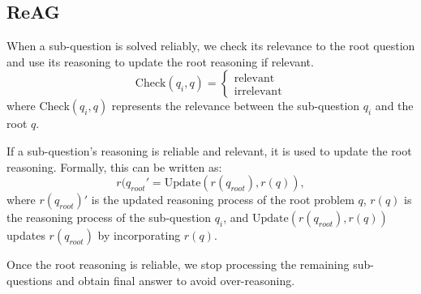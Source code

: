 \documentclass[11pt]{article}
\begin{document}
\subsection{ReAG}
\label{sec:reag}
When a sub-question is solved reliably, we check its relevance to the root question and use its reasoning to update the root reasoning if relevant.
\begin{equation}
\text{Check}(q_i, q) = 
    \begin{cases}
    \text{relevant} \\
    \text{irrelevant} 
    \end{cases}
\end{equation}
where Check$(q_i, q)$ represents the relevance between the sub-question $q_i$ and the root $q$.

If a sub-question’s reasoning is reliable and relevant, it is used to update the root reasoning. Formally, this can be written as:
\begin{equation}
r(q_{root}' = \text{Update}(r(q_{root}), r(q)),
\label{eq:update}
\end{equation}
where \( r(q_{root})' \) is the updated reasoning process of the root problem \( q \), \( r(q) \) is the reasoning process of the sub-question \( q_i \), and \( \text{Update}(r(q_{root}), r(q)) \) updates \( r(q_{root}) \) by incorporating \( r(q) \). 

Once the root reasoning is reliable, we stop processing the remaining sub-questions and obtain final answer to avoid over-reasoning.
\end{document}
